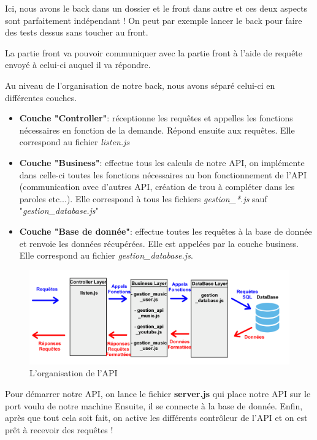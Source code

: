 \documentclass[12pt,french]{article}
\begin{document}
Ici, nous avons le back dans un dossier et le front dans autre et ces deux aspects sont parfaitement indépendant ! On peut par exemple lancer le back pour faire des tests dessus sans toucher au front.

La partie front va pouvoir communiquer avec la partie front à l'aide de requête envoyé à celui-ci auquel il va répondre.

\bigskip

Au niveau de l'organisation de notre back, nous avons séparé celui-ci en différentes couches.

\medskip

\begin{itemize}
	\item \textbf{Couche "Controller"}: réceptionne les requêtes et appelles les fonctions nécessaires en fonction de la demande. Répond ensuite aux requêtes. Elle correspond au fichier \textit{listen.js}
	\item \textbf{Couche "Business"}: effectue tous les calculs de notre API, on implémente dans celle-ci toutes les fonctions nécessaires au bon fonctionnement de l'API (communication avec d'autres API, création de trou à compléter dans les paroles etc...). Elle correspond à tous les fichiers \textit{gestion\_*.js} sauf "\textit{gestion\_database.js}"
	\item \textbf{Couche "Base de donnée"}: effectue toutes les requêtes à la base de donnée et renvoie les données récupérées. Elle est appelées par la couche business. Elle correspond au fichier \textit{gestion\_database.js}.
	
\end{itemize}

\bigskip

\begin{figure}[H]
	\centering
	\includegraphics[scale=0.1]{api_couche.png}
	\caption{
	L'organisation de l'API}    
\end{figure}

\bigskip

Pour démarrer notre API, on lance le fichier \textbf{server.js} qui place notre API sur le port voulu de notre machine
Ensuite, il se connecte à la base de donnée. Enfin, après que tout cela soit fait, on active les différents contrôleur de l'API et on est prêt à recevoir des requêtes !
\end{document}
